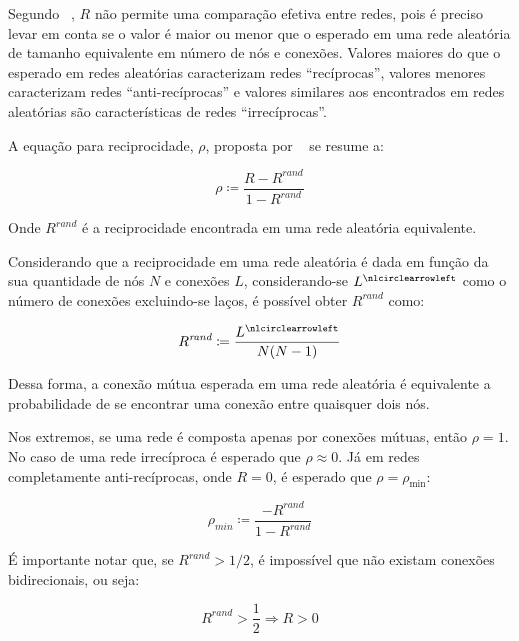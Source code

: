 \documentclass[12pt,a4paper,final]{article}
\newcommand{\defn}{\coloneqq} %
\newcommand{\noloop}[1]{#1^\nlcirclearrowleft} %
\begin{document}
Segundo ~, $R$ não permite uma comparação efetiva entre redes, pois é preciso levar em conta se o valor é maior ou menor que o esperado em uma rede aleatória de tamanho equivalente em número de nós e conexões. Valores maiores do que o esperado em redes aleatórias caracterizam redes \enquote{recíprocas}, valores menores caracterizam redes \enquote{anti-recíprocas} e valores similares aos encontrados em redes aleatórias são características de redes \enquote{irrecíprocas}.

A equação para reciprocidade, $\rho$, proposta por ~ se resume a:

\begin{equation} \label{eq:reciprocidade-rand}
\rho \defn \frac{R - R^\textit{rand}}{1 - R^\textit{rand}}
\end{equation}

Onde $R^\textit{rand}$ é a reciprocidade encontrada em uma rede aleatória equivalente.

Considerando que a reciprocidade em uma rede aleatória é dada em função da sua quantidade de nós $N$ e conexões $L$, considerando-se $\noloop{L}$ como o número de conexões excluindo-se laços, é possível obter $R^\textit{rand}$ como:

\begin{equation}
R^\textit{rand} \defn \frac{\noloop{L}}{N(N - 1)}
\end{equation}

Dessa forma, a conexão mútua esperada em uma rede aleatória é equivalente a probabilidade de se encontrar uma conexão entre quaisquer dois nós. 

Nos extremos, se uma rede é composta apenas por conexões mútuas, então $\rho = 1$. No caso de uma rede irrecíproca é esperado que $\rho \approx 0$. Já em redes completamente anti-recíprocas, onde $R = 0$, é esperado que $\rho = \rho_\text{min}$:

\begin{equation}
\rho_\textit{min} \defn \frac{- R^\textit{rand}}{1 - R^\textit{rand}}
\end{equation}

É importante notar que, se $R^\textit{rand} > 1/2$, é impossível que não existam conexões bidirecionais, ou seja:

\begin{equation}
R^\textit{rand} > \frac{1}{2} \Rightarrow R > 0
\end{equation}
\end{document}
